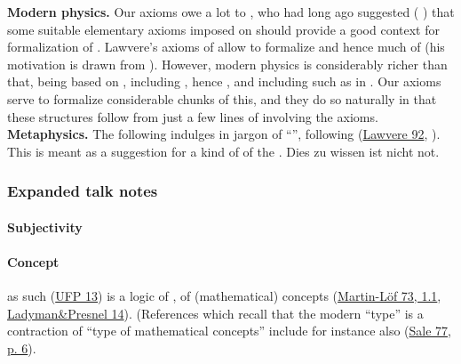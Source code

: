 \textbf{Modern physics.} Our axioms owe a lot to , who had long ago suggested (  ) that some suitable elementary axioms imposed on  should provide a good context for formalization of . Lawvere's axioms of  allow to formalize  and hence much of  (his motivation is drawn from ). However, modern physics is considerably richer than that, being based on    , including , hence , and including  such as  in . Our axioms serve to formalize considerable chunks of this, and they do so naturally in that these structures follow from just a few lines of  involving the axioms.
\textbf{Metaphysics.} The following indulges in  jargon of ``'', following (\href{http://ncatlab.org/nlab/show/objective+and+subjective+logic#Lawvere92}{Lawvere 92}, ). This is meant as a suggestion for a kind of  of the . Dies zu wissen ist nicht not.
\hypertarget{expanded_talk_notes}{}\subsubsection*{{Expanded talk notes}}\label{expanded_talk_notes}
\hypertarget{FormalizationConcepts}{}\paragraph*{{Subjectivity}}\label{FormalizationConcepts}
\hypertarget{ConceptFormalization}{}\paragraph*{{Concept}}\label{ConceptFormalization}
 as such (\hyperlink{UFP13}{UFP 13}) is a logic of , of (mathematical) concepts (\hyperlink{MartinLoef73}{Martin-Löf 73, 1.1}, \hyperlink{LadymanPresnel14}{Ladyman\&Presnel 14}). (References which recall that the modern ``type'' is a contraction of ``type of mathematical concepts'' include for instance also (\hyperlink{Sale77}{Sale 77, p. 6}).
